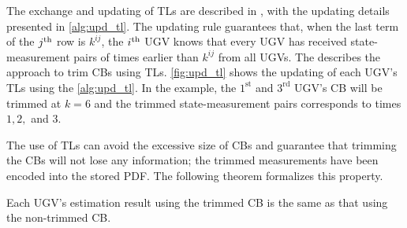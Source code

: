 	
	The exchange and updating of TLs are described in , with the updating details presented in \cref{alg:upd_tl}.
	The updating rule guarantees that, when the last term of the $j^\text{th}$ row is $k^{ij}$, the $i^\text{th}$ UGV knows that every UGV has received state-measurement pairs of times earlier than $k^{ij}$ from all UGVs.
	The  describes the approach to trim CBs using TLs.
%	
	\cref{fig:upd_tl} shows the updating of each UGV's TLs using the \cref{alg:upd_tl}.
	In the example, the $1^\text{st}$ and $3^\text{rd}$ UGV's CB will be trimmed at $k=6$ and the trimmed state-measurement pairs corresponds to times $1,2,$ and $3$.
	
	The use of TLs can avoid the excessive size of CBs and guarantee that trimming the CBs will not lose any information; the trimmed measurements have been encoded into the stored PDF.
	The following theorem formalizes this property.
	
	\begin{thm}\label{thm:trim_no_loss}
		Each UGV's estimation result using the trimmed CB is the same as that using the non-trimmed CB.
	\end{thm}
	
